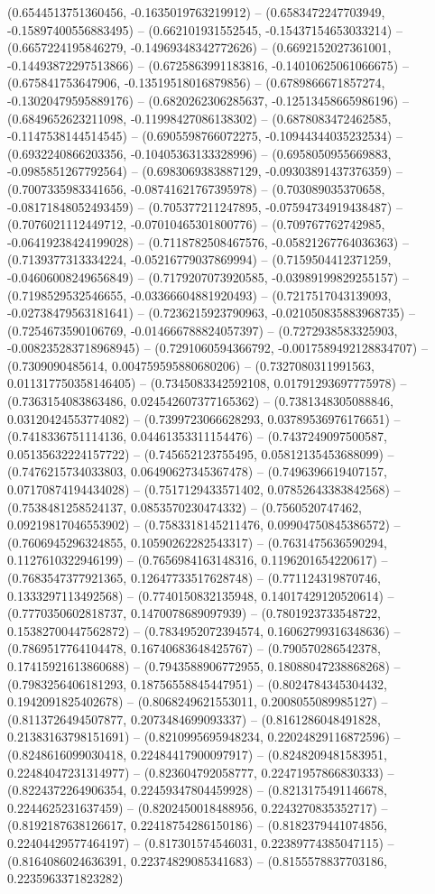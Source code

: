 (0.6544513751360456, -0.1635019763219912) -- (0.6583472247703949, -0.15897400556883495) -- (0.662101931552545, -0.15437154653033214) -- (0.6657224195846279, -0.14969348342772626) -- (0.6692152027361001, -0.14493872297513866) -- (0.6725863991183816, -0.14010625061066675) -- (0.675841753647906, -0.13519518016879856) -- (0.6789866671857274, -0.13020479595889176) -- (0.6820262306285637, -0.12513458665986196) -- (0.6849652623211098, -0.11998427086138302) -- (0.6878083472462585, -0.1147538144514545) -- (0.6905598766072275, -0.10944344035232534) -- (0.6932240866203356, -0.10405363133328996) -- (0.6958050955669883, -0.0985851267792564) -- (0.6983069383887129, -0.09303891437376359) -- (0.7007335983341656, -0.08741621767395978) -- (0.703089035370658, -0.08171848052493459) -- (0.705377211247895, -0.07594734919438487) -- (0.7076021112449712, -0.07010465301800776) -- (0.709767762742985, -0.06419238424199028) -- (0.7118782508467576, -0.05821267764036363) -- (0.7139377313334224, -0.05216779037869994) -- (0.7159504412371259, -0.04606008249656849) -- (0.7179207073920585, -0.03989199829255157) -- (0.7198529532546655, -0.03366604881920493) -- (0.7217517043139093, -0.02738479563181641) -- (0.7236215923790963, -0.021050835883968735) -- (0.7254673590106769, -0.014666788824057397) -- (0.7272938583325903, -0.008235283718968945) -- (0.7291060594366792, -0.0017589492128834707) -- (0.7309090485614, 0.004759595880680206) -- (0.7327080311991563, 0.011317750358146405) -- (0.7345083342592108, 0.01791293697775978) -- (0.7363154083863486, 0.024542607377165362) -- (0.7381348305088846, 0.03120424553774082) -- (0.7399723066628293, 0.03789536976176651) -- (0.7418336751114136, 0.04461353311154476) -- (0.7437249097500587, 0.05135632224157722) -- (0.745652123755495, 0.05812135453688099) -- (0.7476215734033803, 0.06490627345367478) -- (0.7496396619407157, 0.07170874194434028) -- (0.7517129433571402, 0.07852643383842568) -- (0.7538481258524137, 0.0853570230474332) -- (0.7560520747462, 0.09219817046553902) -- (0.7583318145211476, 0.09904750845386572) -- (0.7606945296324855, 0.10590262282543317) -- (0.7631475636590294, 0.1127610322946199) -- (0.7656984163148316, 0.1196201654220617) -- (0.7683547377921365, 0.12647733517628748) -- (0.771124319870746, 0.1333297113492568) -- (0.7740150832135948, 0.14017429120520614) -- (0.7770350602818737, 0.1470078689097939) -- (0.7801923733548722, 0.15382700447562872) -- (0.7834952072394574, 0.16062799316348636) -- (0.7869517764104478, 0.16740683648425767) -- (0.790570286542378, 0.17415921613860688) -- (0.7943588906772955, 0.18088047238868268) -- (0.7983256406181293, 0.18756558845447951) -- (0.8024784345304432, 0.1942091825402678) -- (0.8068249621553011, 0.2008055089985127) -- (0.8113726494507877, 0.2073484699093337) -- (0.8161286048491828, 0.21383163798151691) -- (0.8210995695948234, 0.22024829116872596) -- (0.8248616099030418, 0.22484417900097917) -- (0.8248209481583951, 0.22484047231314977) -- (0.823604792058777, 0.22471957866830333) -- (0.8224372264906354, 0.22459347804459928) -- (0.8213175491146678, 0.2244625231637459) -- (0.8202450018488956, 0.2243270835352717) -- (0.8192187638126617, 0.22418754286150186) -- (0.8182379441074856, 0.22404429577464197) -- (0.817301574546031, 0.22389774385047115) -- (0.8164086024636391, 0.22374829085341683) -- (0.8155578837703186, 0.2235963371823282) 